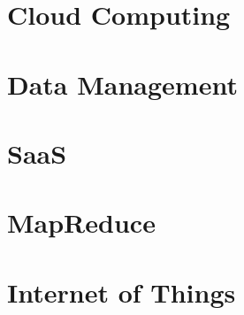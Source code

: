 \part{Cloud Computing}


%

%





\part{Data Management}



\part{SaaS}
\label{sec:icloud-saas}



\part{MapReduce}







%
%

\part{Internet of Things}

